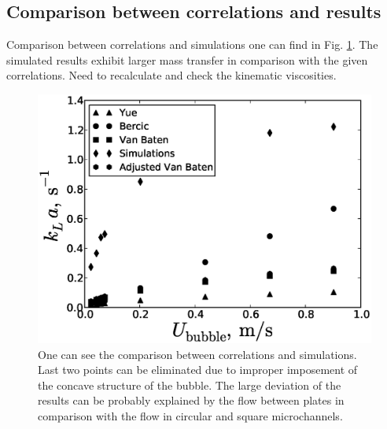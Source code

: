 \documentclass{article}
\begin{document}
\subsection{Comparison between correlations and results}
Comparison between correlations and simulations one can find in Fig.
\ref{fig:comparison:correlations}. The simulated results exhibit larger mass transfer in comparison
with the given correlations. {\color{red} Need to recalculate and check the kinematic viscosities.}
\begin{figure}[htb!]
\includegraphics[width=\textwidth]{Figures/comparison_correlations.eps}
\caption{One can see the comparison between correlations and simulations. {\color{red} Last two
points can be eliminated due to improper imposement of the concave structure of the bubble. The
large deviation of the results can be probably explained by the flow between plates in comparison
with the flow in circular and square microchannels.} \label{fig:comparison:correlations}}
\end{figure}

\appendix
\end{document}
